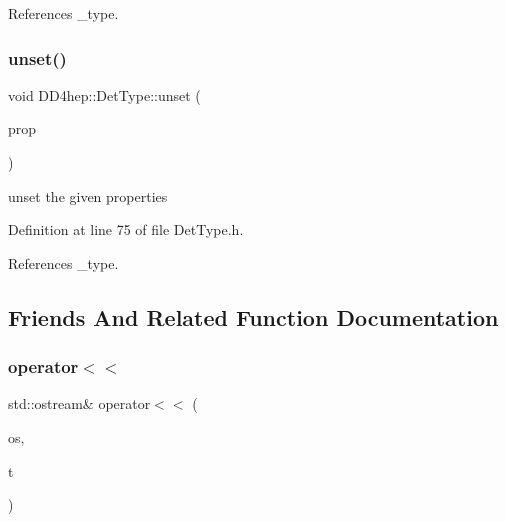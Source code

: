 References \+\_\+type.

\hypertarget{class_d_d4hep_1_1_det_type_aad9477be2d3a9a23cb1edb0d2435ad31}{}\label{class_d_d4hep_1_1_det_type_aad9477be2d3a9a23cb1edb0d2435ad31} 
\subsubsection{\texorpdfstring{unset()}{unset()}}
{\footnotesize\ttfamily void D\+D4hep\+::\+Det\+Type\+::unset (\begin{DoxyParamCaption}\item[{unsigned long}]{prop }\end{DoxyParamCaption})\hspace{0.3cm}{\ttfamily [inline]}}



unset the given properties 



Definition at line 75 of file Det\+Type.\+h.



References \+\_\+type.



\subsection{Friends And Related Function Documentation}
\hypertarget{class_d_d4hep_1_1_det_type_a41fbd8f60c0ec1ac2866c6dc20c628f5}{}\label{class_d_d4hep_1_1_det_type_a41fbd8f60c0ec1ac2866c6dc20c628f5} 
\subsubsection{\texorpdfstring{operator$<$$<$}{operator<<}}
{\footnotesize\ttfamily std\+::ostream\& operator$<$$<$ (\begin{DoxyParamCaption}\item[{std\+::ostream \&}]{os,  }\item[{const \hyperlink{class_d_d4hep_1_1_det_type}{Det\+Type} \&}]{t }\end{DoxyParamCaption})\hspace{0.3cm}{\ttfamily [friend]}}



